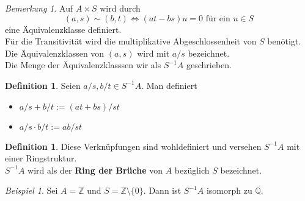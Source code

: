 \documentclass[10pt,a4paper]{article}
\newcommand{\Z}{\ensuremath{\mathbb{Z}}}
\newcommand{\Q}{\ensuremath{\mathbb{Q}}}
\theoremstyle{plain}
\theoremstyle{definition}
\newtheorem{definition}[theorem]{Definition}
\theoremstyle{remark}
\newtheorem{bem}[theorem]{Bemerkung}
\newtheorem{exm}[theorem]{Beispiel}
\begin{document}
	\begin{bem}
		Auf $A\times S$ wird durch 
		\[(a,s)\sim (b,t)\Leftrightarrow (at-bs)u=0\text{ für ein $u\in S$}\]
		eine Äquivalenzklasse definiert.\\
		Für die Transitivität wird die multiplikative Abgeschlossenheit von $S$ benötigt.\\
		Die Äquivalenzklassen von $(a,s)$ wird mit $a/s$ bezeichnet.\\
		Die Menge der Äquivalenzklasssen wir als $S^{-1}A$ geschrieben.
	\end{bem}

	\begin{definition}		
		Seien $a/s,b/t\in S^{-1}A$. Man definiert
		\begin{itemize}
			\item $a/s+b/t:=(at+bs)/st$
			\item $a/s\cdot b/t:=ab/st$
		\end{itemize}
	\end{definition}

	\begin{definition}
		Diese Verknüpfungen sind wohldefiniert und versehen $S^{-1}A$ mit einer Ringstruktur.\\
		$S^{-1}A$ wird als der \textbf{Ring der Brüche} von $A$ bezüglich $S$ bezeichnet.
	\end{definition}

	\begin{exm}
		Sei $A=\Z$ und $S=\Z\setminus\{0\}$. Dann ist $S^{-1}A$ isomorph zu $\Q$.
	\end{exm}
\end{document}
